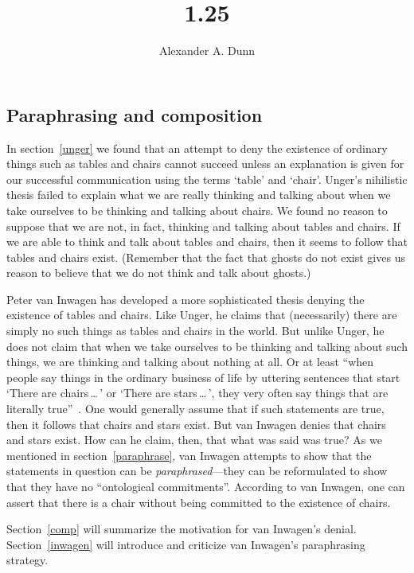 \documentclass[11pt]{standalone}
\title{1.25}
\author{Alexander A. Dunn}
\begin{document}
\ifstandalone
\maketitle
\begin{spacing}{1.5}
\fi

\section{Paraphrasing and composition}
In section~\ref{unger} we found that an attempt to deny the existence
of ordinary things such as tables and chairs cannot succeed unless an
explanation is given for our successful communication using the terms
`table' and `chair'.  Unger's nihilistic thesis failed to explain what
we are really thinking and talking about when we take ourselves to be
thinking and talking about chairs.  We found no reason to suppose that
we are not, in fact, thinking and talking about tables and chairs.  If
we are able to think and talk about tables and chairs, then it seems
to follow that tables and chairs exist.  (Remember that the fact that
ghosts do not exist gives us reason to believe that we do not think
and talk about ghosts.)

Peter van Inwagen has developed a more sophisticated thesis denying
the existence of tables and chairs.  Like Unger, he claims that
(necessarily) there are simply no such things as tables and chairs in
the world.  But unlike Unger, he does not claim that when we take
ourselves to be thinking and talking about such things, we are
thinking and talking about nothing at all.  Or at least ``when people
say things in the ordinary business of life by uttering sentences that
start `There are chairs\,\ldots\,' or `There are stars\,\ldots\,',
they very often say things that are literally
true''~\citep[102]{inwagen1995}.  One would generally assume that if
such statements are true, then it follows that chairs and stars exist.
But van Inwagen denies that chairs and stars exist.  How can he claim,
then, that what was said was true?  As we mentioned in
section~\ref{paraphrase}, van Inwagen attempts to show that the
statements in question can be {\em paraphrased}---they can be
reformulated to show that they have no ``ontological commitments''.
According to van Inwagen, one can assert that there is a chair without
being committed to the existence of chairs.

Section~\ref{comp} will summarize the motivation for van Inwagen's
denial.  Section~\ref{inwagen} will introduce and criticize van
Inwagen's paraphrasing strategy.


\end{spacing}
\end{document}
